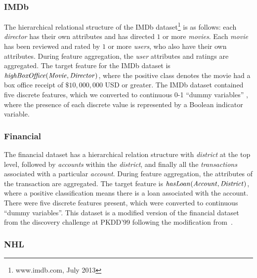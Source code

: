 \documentclass[conference]{IEEEtran}
\begin{document}
\subsubsection{IMDb}
The hierarchical relational structure of the IMDb dataset\footnote{www.imdb.com, July 2013} is as follows: each \textit{director} has their own attributes and has directed $1$ or more \textit{movies}. Each \textit{movie} has been reviewed and rated by $1$ or more \textit{users}, who also have their own attributes. During feature aggregation, the \textit{user} attributes and ratings are aggregated. The target feature for the IMDb dataset is $\it{highBoxOffice(Movie,Director)}$, where the positive class denotes the movie had a box office receipt of $\$10,000,000$  USD or greater. The IMDb dataset contained five discrete features, which we converted to continuous 0-1 ``dummy variables'' \cite{Gelman2007}, where the presence of each discrete value is represented by a Boolean indicator variable. %

\subsubsection{Financial}
The financial dataset has a hierarchical relation structure with \textit{district} at the top level, followed by \textit{accounts} within the \textit{district}, and finally all the \textit{transactions} associated with a particular \textit{account}. During feature aggregation, the attributes of the transaction are aggregated. The target feature is $\it{hasLoan(Account,District)}$, where a positive classification means there is a loan associated with the account. There were five discrete features present, which were converted to continuous ``dummy variables''. This dataset is a modified version of the financial dataset from the discovery challenge at PKDD'99 following the modification from~\cite{Yin2004}.

\subsubsection{NHL}
\end{document}
